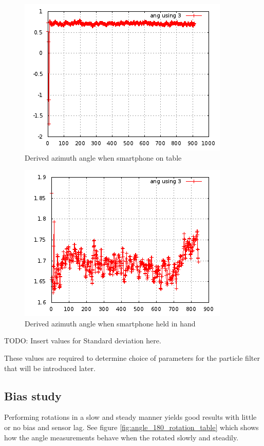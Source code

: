 \begin{figure}\centering
    \includegraphics{figures/angle_stationary_table.png}
    \caption{Derived azimuth angle when smartphone on table}
\end{figure}

\begin{figure}\centering
    \includegraphics{figures/angle_handheld_standing.png}
    \caption{Derived azimuth angle when smartphone held in hand}
\end{figure}


TODO: Insert values for Standard deviation here.

These values are required to determine choice of parameters for the particle
filter that will be introduced later.

\subsection{Bias study}

Performing rotations in a slow and steady manner yields good results with little
or no bias and sensor lag. See figure \ref{fig:angle_180_rotation_table} which 
shows how the angle measurements behave when the rotated slowly and steadily.

